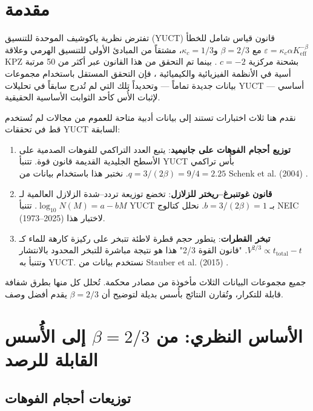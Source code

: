 \documentclass[11pt,a4paper]{article}
\newcommand{\eps}{\varepsilon}
\newcommand{\kappac}{\kappa_c}
\newcommand{\Keff}{K_{\mathrm{eff}}}
\newcommand{\betaf}{\beta}
\begin{document}
	\section{مقدمة}
	
	تفترض نظرية ياكوشيف الموحدة للتنسيق (YUCT) قانون قياس شامل للخطأ \(\eps = \kappac \alpha \Keff^{-\betaf}\) مع \(\betaf = 2/3\) و\(\kappac = 1/3\)، مشتقاً من المبادئ الأولى للتنسيق الهرمي وعلاقة KPZ بشحنة مركزية \(c = -2\) \cite{AppendixY, AppendixL}. بينما تم التحقق من هذا القانون عبر أكثر من 50 مرتبة أسية في الأنظمة الفيزيائية والكيميائية \cite{AppendixC, AppendixG}، فإن التحقق المستقل باستخدام مجموعات بيانات جديدة تماماً — وتحديداً تلك التي لم تُدرج سابقاً في تحليلات YUCT — أساسي لإثبات الأُس كأحد الثوابت الأساسية الحقيقية.
	
	نقدم هنا ثلاث اختبارات تستند إلى بيانات أدبية متاحة للعموم من مجالات لم تُستخدم قط في تحققات YUCT السابقة:
	
	\begin{enumerate}
		\item \textbf{توزيع أحجام الفوهات على جانيميد}: يتبع العدد التراكمي للفوهات الصدمية على الأسطح الجليدية القديمة قانون قوة. تتنبأ YUCT بأُس تراكمي \(q = 3/(2\betaf) = 9/4 = 2.25\). نختبر هذا باستخدام بيانات من Schenk et al. (2004) \cite{Schenk2004}.
		\item \textbf{قانون غوتنبرغ–ريختر للزلازل}: تخضع توزيعة تردد–شدة الزلازل العالمية لـ \(\log_{10} N(M) = a - bM\). تتنبأ YUCT بـ \(b = 3/(2\betaf) = 1\). نحلل كتالوج NEIC (1973–2025) \cite{USGSNEIC} لاختبار هذا.
		\item \textbf{تبخر القطرات}: يتطور حجم قطرة لاطئة تتبخر على ركيزة كارهة للماء كـ \(V^{2/3} \propto t_{\text{total}} - t\). "قانون القوة 2/3" هذا هو نتيجة مباشرة للتبخر المحدود بالانتشار وتتنبأ به YUCT. نستخدم بيانات من Stauber et al. (2015) \cite{Stauber2015}.
	\end{enumerate}
	
	جميع مجموعات البيانات الثلاث مأخوذة من مصادر محكمة. تُحلل كل منها بطرق شفافة قابلة للتكرار، وتُقارن النتائج بأُسس بديلة لتوضيح أن \(\betaf = 2/3\) يقدم أفضل وصف.
	
	\section{الأساس النظري: من \(\betaf = 2/3\) إلى الأُسس القابلة للرصد}
	
	\subsection{توزيعات أحجام الفوهات}
	
\end{document}
